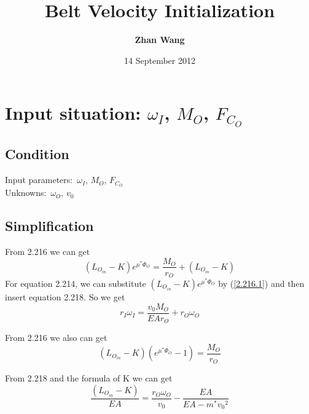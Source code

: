 \documentclass[a4paper,fleqn,13pt]{article}
\begin{document}
\title{	Belt Velocity Initialization}
\author{\bf Zhan Wang}
\date{ 14 September 2012}
\maketitle
\pagestyle{fancy}
\rhead{}
\lhead{}
\oddsidemargin 0in
\evensidemargin 0in
\tableofcontents

\newpage
\flushleft


\section{Input situation: $\omega_I$, $M_O$, $F_{C_O}$}

\subsection{Condition}
Input parameters:\ $\omega_I$, $M_O$, $F_{C_O}$ \\
Unknowns:\ $\omega_O$, $v_0$

\subsection{Simplification}
From 2.216 we can get
\begin{equation}  \label{2.216.1}
 \left(L_{O_{in}} - K \right)e^{\mu^* \Phi_O} = \frac{M_O}{r_O} + \left(L_{O_{in}} - K \right) 
\end{equation}
For equation 2.214, we can substitute $\left(L_{O_{in}} - K \right)e^{\mu^* \Phi_O}$ by (\ref{2.216.1}) and then insert equation 2.218. So we get 
\begin{equation}  \label{Eq:equation1_S1}
 r_I \omega_I = \frac{v_0 M_O}{E A r_O} + r_O \omega_O
\end{equation}

From 2.216 we also can get 
\begin{equation}  \label{2.216.2}
 \left(L_{O_{in}} - K \right) \left(e^{\mu^* \Phi_O}-1 \right) = \frac{M_O}{r_O} 
\end{equation}

From 2.218 and the formula of K we can get 
\begin{equation}  \label{2.218}
 \frac{ \left(L_{O_{in}} - K \right) }{EA} = \frac{r_O \omega_O}{v_0}  - \frac{EA}{EA-m^{*}{v_0}^2}
\end{equation}
\end{document}
